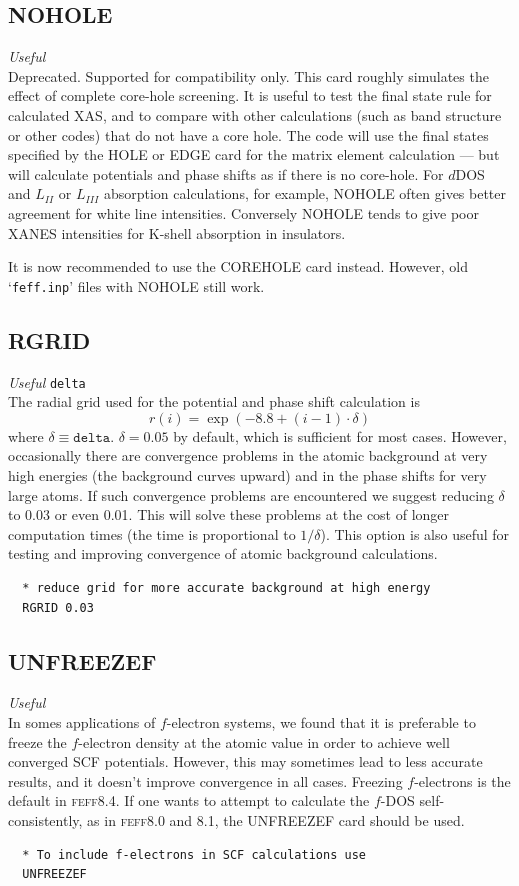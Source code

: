 \documentclass[11pt,oneside]{report} %
\renewcommand{\htmlref}[2]{\hyperlink{#2}{#1}}
\newcommand{\program}[1]{\textsc{#1}}
\newcommand{\feff}{\program{feff}}
\newenvironment{Card}[4]%
      {\vspace{3ex}%
        \subsection{#1}
        \quad\textsl{#3}\newline
        \quad\texttt{#2}\newline%
        \label{card:#4}\\}
      {}
\newcommand{\file}[1]{`\texttt{#1}'}
\renewcommand{\htmlref}[2]{{#1}} %
\begin{document}
\begin{Card}{NOHOLE}{}{Useful}{noh}
  Deprecated.  Supported for compatibility only.  This card roughly simulates the effect of complete core-hole
  screening. It is useful to test the final state rule for
  calculated XAS, and to compare with other calculations (such as band
  structure or other codes) that do not have a core hole.
  The code will use the final states specified by the \htmlref{HOLE}{card:hol}
  or \htmlref{EDGE}{card:edg} card
  for the matrix element calculation --- but will calculate potentials and phase shifts as if
  there is no core-hole. For $d$DOS and $L_{II}$ or $L_{III}$
  absorption calculations, for example,  NOHOLE often gives better
  agreement for white line intensities. Conversely NOHOLE tends to give
  poor XANES intensities for K-shell absorption in insulators.
  
  It is now recommended to use the COREHOLE card instead.  However, old \file{feff.inp} files with
  NOHOLE still work.
\end{Card}



\begin{Card}{RGRID}{delta}{Useful}{rgr}
  The radial grid used for the potential and phase shift calculation
  is $$r(i) = \exp(-8.8 + (i-1)\cdot\delta)$$ where $\delta\equiv\mathtt{delta}$. 
  $\delta=0.05$ by default, which is sufficient for most cases. 
  However, occasionally there are convergence problems in the atomic background 
  at very high energies (the background curves upward) and in the phase
  shifts for very large atoms. If such convergence problems are encountered
  we suggest reducing $\delta$ to 0.03 or even 0.01. This will solve
  these problems at the cost of longer computation times (the time is
  proportional to $1/\delta $). This option is also useful for testing
  and improving convergence of atomic background calculations.
\end{Card}
\begin{verbatim}
  * reduce grid for more accurate background at high energy
  RGRID 0.03
\end{verbatim}



\begin{Card}{UNFREEZEF}{}{Useful}{unf}
In somes applications of $f$-electron
systems, we found that it is preferable to freeze the $f$-electron
density at the atomic value in order to achieve well converged
SCF potentials. However, this may sometimes lead to less accurate results,
and it doesn't improve convergence in all cases.  Freezing $f$-electrons is the default in {\feff}8.4. If one wants
to attempt to calculate the $f$-DOS self-consistently,
as in {\feff}8.0 and 8.1, the UNFREEZEF card should be used.
\begin{verbatim}
  * To include f-electrons in SCF calculations use
  UNFREEZEF 
\end{verbatim}
\end{Card}
\end{document}
